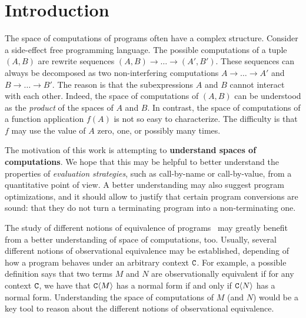 \chapter{Introduction}

The space of computations of programs often have a complex structure.
Consider a side-effect free programming language.
The possible computations of a tuple $(A,B)$
are rewrite sequences $(A,B) \to \hdots \to (A',B')$.
These sequences can always be decomposed as two non-interfering computations
$A \to \hdots \to A'$ and $B \to \hdots \to B'$.
The reason is that the subexpressions $A$ and $B$ cannot interact with each other.
Indeed, the space of computations of $(A,B)$ can be understood as
the {\em product} of the spaces of $A$ and $B$.
In contrast, the space of computations of a function application $f(A)$ is not so easy
to characterize. The difficulty is that $f$ may use the value of $A$ zero, one, or
possibly many times.

The motivation of this work is attempting to {\bf understand spaces of computations}.
We hope that this may be helpful to better understand the properties of {\em evaluation strategies},
such as call-by-name or call-by-value,
from a quantitative point of view.
A better understanding may also suggest program optimizations,
and it should allow to justify that certain program conversions are sound:
\eg that they do not turn a terminating program into a non-terminating one.

The study of different notions of equivalence of programs~\cite{Tesis:Morris,Bre16}
may greatly benefit from a better understanding of space of computations, too.
Usually, several different notions of observational equivalence may be
established, depending of how a program behaves under an arbitrary context $\mathtt{C}$.
For example, a possible definition says that two terms $M$ and $N$
are observationally equivalent if for any context $\mathtt{C}$, we have that
$\mathtt{C}\langle M\rangle$ has a normal form if and only if $\mathtt{C}\langle N\rangle$ has a normal form.
Understanding the space of computations of $M$ (and $N$) would be a key
tool to reason about the different notions of observational equivalence.

\bigskip


